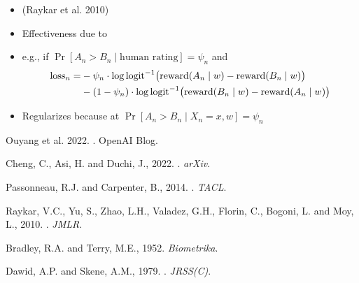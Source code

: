 \documentclass[9pt]{report}
\begin{document}
\begin{itemize}
\item {} \hfill {\small (Raykar et
    al. 2010)}
\item Effectiveness due to 
\item e.g., if $\Pr[A_n > B_n \mid \textrm{human rating}] = \psi_n$ and
\begin{align*}
  \textrm{loss}_n = &- \psi_n \cdot \log  \textrm{logit}^{-1}\!\left(\strut \textrm{reward}(A_n \mid w) -                 \textrm{reward}(B_n \mid w)\right) 
  \\
  &- (1 - \psi_n) \cdot \log \textrm{logit}^{-1}\!\left(\strut \textrm{reward}(B_n \mid w) -                 \textrm{reward}(A_n \mid w)\right) 
\end{align*}
\item Regularizes because  at $\Pr[A_n > B_n \mid X_n
  = x, w] = \psi_n$
\end{itemize}

\begin{subitemize}
  \footnotesize
\item Ouyang et al. 2022. . OpenAI Blog.
\item Cheng, C., Asi, H. and Duchi, J., 2022. . \textit{arXiv}. 
\item Passonneau, R.J. and Carpenter, B., 2014. . \textit{TACL}. 
\item Raykar, V.C., Yu, S., Zhao, L.H., Valadez, G.H., Florin, C., 
  Bogoni, L. and Moy, L., 2010. . \textit{JMLR}. 
\item Bradley, R.A. and Terry, M.E., 1952. 
  \textit{Biometrika}. 
\item Dawid, A.P. and Skene, A.M., 1979. . \textit{JRSS(C)}.
\end{subitemize}
\end{document}
